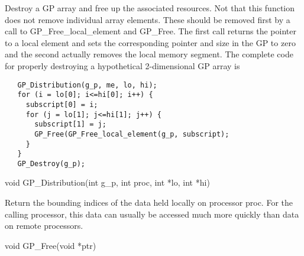 \documentclass[12pt]{article}
\begin{document}
\local

\begin{desc}

Destroy a GP array and free up the associated resources. Not that this function
does not remove individual array elements. These should be removed first by a
call to GP_Free_local_element and GP_Free. The first call returns the pointer to
a local element and sets the corresponding pointer and size in the GP to zero
and the second actually removes the local memory segment. The complete code for
properly destroying a hypothetical 2-dimensional GP array is

\begin{verbatim}
   GP_Distribution(g_p, me, lo, hi);
   for (i = lo[0]; i<=hi[0]; i++) {
     subscript[0] = i;
     for (j = lo[1]; j<=hi[1]; j++) {
       subscript[1] = j;
       GP_Free(GP_Free_local_element(g_p, subscript);
     }
   }
   GP_Destroy(g_p);
\end{verbatim}

\end{desc}



\begin{capi}
\begin{ccode}
void GP_Distribution(int g_p, int proc, int *lo, int *hi)
\begin{funcargs}
\end{funcargs}
\end{ccode}
\end{capi}

\local

\begin{desc}

Return the bounding indices of the data held locally on processor proc. For the
calling processor, this data can usually be accessed much more quickly than data
on remote processors.

\end{desc}


\begin{capi}
\begin{ccode}
void GP_Free(void *ptr)
\begin{funcargs}
\end{funcargs}
\end{ccode}
\end{capi}
\end{document}
